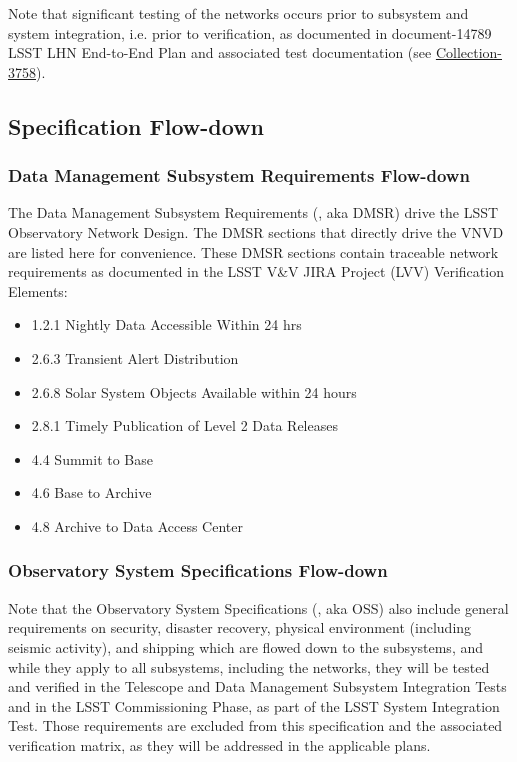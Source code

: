 \documentclass[DM,lsstdraft,STS,toc]{lsstdoc}
\begin{document}
Note that significant testing of the networks occurs prior to subsystem and system integration,
i.e. prior to verification, as documented in document-14789 LSST LHN End-to-End Plan and
associated test documentation
(see \href{https://docushare.lsstcorp.org/docushare/dsweb/View/Collection-3758}{Collection-3758}).

\subsection{Specification Flow-down}\label{sec:sepcflowd}

\subsubsection{Data Management Subsystem Requirements Flow-down}\label{sec:dmreqflowd}

The Data Management Subsystem Requirements (, aka DMSR) drive the LSST Observatory
Network Design.  The DMSR sections that directly drive the VNVD are listed here for convenience.
These DMSR sections contain traceable network requirements as documented in the LSST V\&V JIRA
Project (LVV) Verification Elements:

\begin{itemize}
\item 1.2.1 Nightly Data Accessible Within 24 hrs
\item 2.6.3 Transient Alert Distribution
\item 2.6.8 Solar System Objects Available within 24 hours
\item 2.8.1 Timely Publication of Level 2 Data Releases
\item 4.4 Summit to Base
\item 4.6 Base to Archive
\item 4.8 Archive to Data Access Center
\end{itemize}

\subsubsection{Observatory System Specifications Flow-down}\label{sec:ossflowd}

Note that the Observatory System Specifications (, aka OSS) also include general requirements
on security, disaster recovery, physical environment (including seismic activity), and shipping
which are flowed down to the subsystems, and while they apply to all subsystems, including the networks,
they will be tested and verified in the Telescope and Data Management Subsystem Integration Tests and in
the LSST Commissioning Phase, as part of the LSST System Integration Test.  Those requirements are excluded
from this specification and the associated verification matrix, as they will be addressed in the applicable plans.
\end{document}
